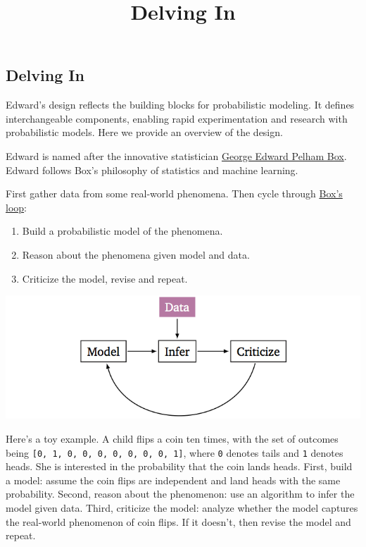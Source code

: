 \title{Delving In}

\subsection{Delving In}

Edward's design reflects the building blocks for probabilistic
modeling. It defines interchangeable components, enabling rapid
experimentation and research with probabilistic models. Here we
provide an overview of the design.

Edward is named after the innovative statistician
\href{https://en.wikipedia.org/wiki/George_E._P._Box}{George Edward
Pelham Box}. Edward follows Box's philosophy of statistics and machine
learning.

First gather data from some real-world phenomena. Then cycle through
\href{http://www.annualreviews.org/eprint/7xbyci3nwAg5kEttvvjk/full/10.1146/annurev-statistics-022513-115657}
{Box's loop}:

\begin{enumerate}
\item Build a probabilistic model of the phenomena.
\item Reason about the phenomena given model and data.
\item Criticize the model, revise and repeat.
\end{enumerate}

\includegraphics{images/model_infer_criticize.png}

Here's a toy example. A child flips a coin ten times, with the set of
outcomes being \texttt{{[}0,\ 1,\ 0,\ 0,\ 0,\ 0,\ 0,\ 0,\ 0,\ 1{]}},
where \texttt{0} denotes tails and \texttt{1} denotes heads. She
is interested in the probability that the coin lands heads. First,
build a model: assume the coin flips are independent and land heads with
the same probability. Second, reason about the phenomenon: use an algorithm
to infer the model given data. Third, criticize the model: analyze
whether the model captures the real-world phenomenon of coin flips. If it
doesn't, then revise the model and repeat.

